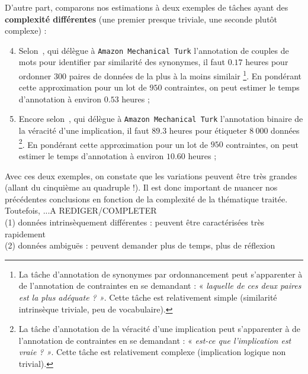 			D'autre part, comparons nos estimations à deux exemples de tâches ayant des \textbf{complexité différentes} (une premier presque triviale, une seconde plutôt complexe) :
			\begin{enumerate}
				\setcounter{enumi}{3}
				\item Selon~, qui délègue à \texttt{Amazon Mechanical Turk} l'annotation de couples de mots pour identifier par similarité des synonymes, il faut $0.17$ heures pour ordonner $300$ paires de données de la plus à la moins similair
				\footnote{La tâche d'annotation de synonymes par ordonnancement peut s'apparenter à de l'annotation de contraintes en se demandant : « \textit{laquelle de ces deux paires est la plus adéquate ? »}. Cette tâche est relativement simple (similarité intrinsèque triviale, peu de vocabulaire).}. En pondérant cette approximation pour un lot de $950$ contraintes, on peut estimer le temps d'annotation à environ $0.53$ heures ;
				\item Encore selon~, qui délègue à \texttt{Amazon Mechanical Turk} l'annotation binaire de la véracité d'une implication, il faut $89.3$ heures pour étiqueter $8~000$ données
				\footnote{La tâche d'annotation de la véracité d'une implication peut s'apparenter à de l'annotation de contraintes en se demandant : « \textit{est-ce que l'implication est vraie ? »}. Cette tâche est relativement complexe (implication logique non trivial). }. En pondérant cette approximation pour un lot de $950$ contraintes, on peut estimer le temps d'annotation à environ $10.60$ heures ;
			\end{enumerate}
			Avec ces deux exemples, on constate que les variations peuvent être très grandes (allant du cinquième au quadruple !).
			Il est donc important de nuancer nos précédentes conclusions en fonction de la complexité de la thématique traitée.
			Toutefois, ...A REDIGER/COMPLETER\\
			
			(1) données intrinsèquement différentes : peuvent être caractérisées très rapidement\\
			(2) données ambiguës : peuvent demander plus de temps, plus de réflexion
			
